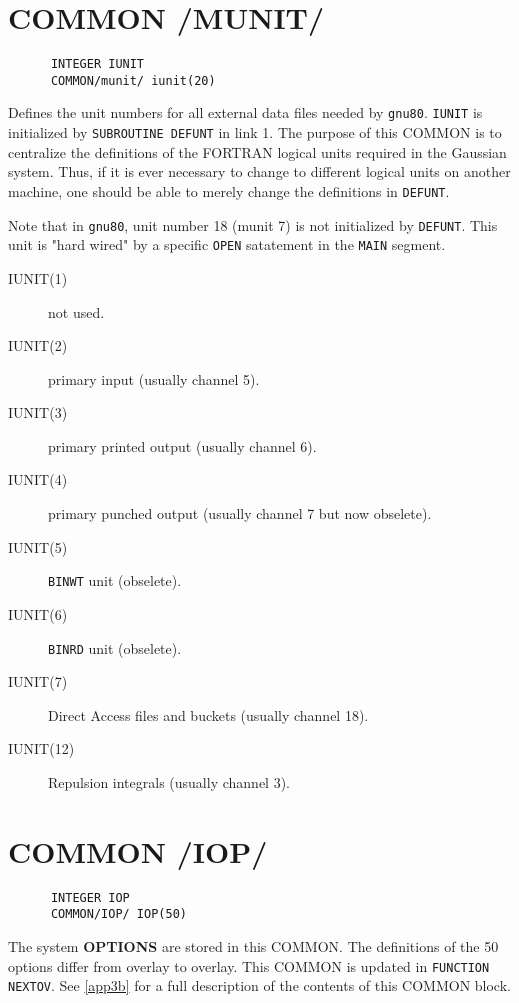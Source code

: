 \section{\sf COMMON /MUNIT/}
{\small
\begin{verbatim}
      INTEGER IUNIT
      COMMON/munit/ iunit(20)
\end{verbatim}
}
Defines the unit numbers for all external data files needed
by {\tt gnu80}.  {\tt IUNIT} is initialized by {\tt SUBROUTINE DEFUNT} in
link 1.  The purpose of this COMMON is to centralize the definitions
of the FORTRAN logical units required in the Gaussian system.  Thus,
if it is ever necessary to change to different logical units on
another machine, one should be able to merely change the definitions
in {\tt DEFUNT}.

Note that in  {\tt gnu80}, unit number 18 (munit 7) is not
initialized by {\tt DEFUNT}.  This unit is "hard wired" 
by a specific {\tt OPEN} satatement in the {\tt MAIN} segment.
\begin{description}
\item[IUNIT(1)]  not used.
\item[IUNIT(2)]  primary input (usually channel 5).
\item[IUNIT(3)]  primary printed output (usually channel 6).
\item[IUNIT(4)]  primary punched output (usually channel 7 but now obselete).
\item[IUNIT(5)]  {\tt BINWT} unit (obselete).
\item[IUNIT(6)]  {\tt BINRD} unit (obselete).
\item[IUNIT(7)]  Direct Access files and buckets (usually channel 18).
\item[IUNIT(12)] Repulsion integrals (usually channel 3).
\end{description}
\newpage
\section{\sf COMMON /IOP/}
{\small
\begin{verbatim}
      INTEGER IOP
      COMMON/IOP/ IOP(50)
\end{verbatim}
}
The system {\bf OPTIONS} are stored in this COMMON. The definitions
of the 50 options differ from overlay to overlay. This COMMON
is updated in {\tt FUNCTION NEXTOV}. See \ref{app3b} for a full description
of the contents of this COMMON block.
\newpage
